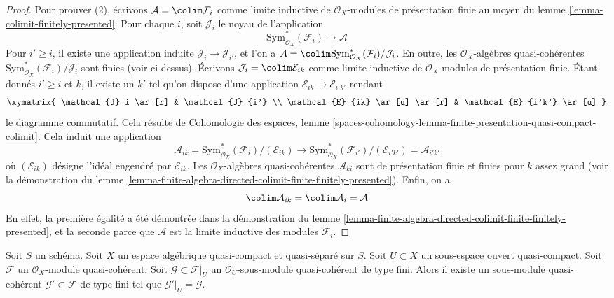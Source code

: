 \begin{proof}
\medskip\noindent
Pour prouver (2), écrivons $\mathcal{A} = \colim \mathcal{F}_i$
comme limite inductive de $\mathcal{O}_X$-modules de présentation finie au moyen du
lemme \ref{lemma-colimit-finitely-presented}.
Pour chaque $i$, soit $\mathcal{J}_i$ le noyau de l'application
$$
\text{Sym}^*_{\mathcal{O}_X}(\mathcal{F}_i) \longrightarrow \mathcal{A}
$$
Pour $i' \geq i$, il existe une application induite $\mathcal{J}_i \to \mathcal{J}_{i'}$,
et l'on a $\mathcal{A} =
\colim \text{Sym}^*_{\mathcal{O}_X}(\mathcal{F}_i)/\mathcal{J}_i$.
En outre, les $\mathcal{O}_X$-algèbres quasi-cohérentes
$\text{Sym}^*_{\mathcal{O}_X}(\mathcal{F}_i)/\mathcal{J}_i$
sont finies (voir ci-dessus). Écrivons $\mathcal{J}_i = \colim \mathcal{E}_{ik}$
comme limite inductive de $\mathcal{O}_X$-modules de présentation finie.
Étant donnés $i' \geq i$ et $k$, il existe un $k'$ tel qu'on
dispose d'une application $\mathcal{E}_{ik} \to \mathcal{E}_{i'k'}$
rendant
$$
\xymatrix{
\mathcal{J}_i \ar[r] & \mathcal{J}_{i'} \\
\mathcal{E}_{ik} \ar[u] \ar[r] & \mathcal{E}_{i'k'} \ar[u]
}
$$
le diagramme commutatif. Cela résulte de
Cohomologie des espaces, lemme
\ref{spaces-cohomology-lemma-finite-presentation-quasi-compact-colimit}.
Cela induit une application
$$
\mathcal{A}_{ik} =
\text{Sym}^*_{\mathcal{O}_X}(\mathcal{F}_i)/(\mathcal{E}_{ik})
\longrightarrow
\text{Sym}^*_{\mathcal{O}_X}(\mathcal{F}_{i'})/(\mathcal{E}_{i'k'}) =
\mathcal{A}_{i'k'}
$$
où $(\mathcal{E}_{ik})$ désigne l'idéal engendré par $\mathcal{E}_{ik}$.
Les $\mathcal{O}_X$-algèbres quasi-cohérentes $\mathcal{A}_{ki}$
sont de présentation finie et finies pour $k$ assez grand
(voir la démonstration du
lemme \ref{lemma-finite-algebra-directed-colimit-finite-finitely-presented}).
Enfin, on a
$$
\colim \mathcal{A}_{ik} = \colim \mathcal{A}_i = \mathcal{A}
$$
En effet, la première égalité a été démontrée dans la démonstration du
lemme \ref{lemma-finite-algebra-directed-colimit-finite-finitely-presented},
et la seconde parce que $\mathcal{A}$ est la limite inductive des
modules $\mathcal{F}_i$.
\end{proof}

\begin{lemma}
\label{lemma-extend}
Soit $S$ un schéma.
Soit $X$ un espace algébrique quasi-compact et quasi-séparé sur $S$.
Soit $U \subset X$ un sous-espace ouvert quasi-compact.
Soit $\mathcal{F}$ un $\mathcal{O}_X$-module quasi-cohérent.
Soit $\mathcal{G} \subset \mathcal{F}|_U$ un
$\mathcal{O}_U$-sous-module quasi-cohérent de type fini. Alors
il existe un sous-module quasi-cohérent $\mathcal{G}' \subset \mathcal{F}$
de type fini tel que $\mathcal{G}'|_U = \mathcal{G}$.
\end{lemma}

